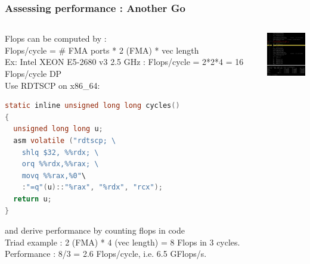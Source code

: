 \begin{frame}[containsverbatim]
\frametitle{Assessing performance : Another Go}

\begin{columns}[c]
	\begin{column}{7cm}
{\footnotesize
Flops can be computed by :
\\
Flops/cycle = \# FMA ports * 2 (FMA) * vec length
\\
Ex: Intel XEON E5-2680 v3 2.5 GHz : Flops/cycle = 2*2*4 = 16 Flops/cycle DP
\\
Use RDTSCP on x86\_64:
\\
{\tiny
\begin{lstlisting}[language=C]
static inline unsigned long long cycles()
{
  unsigned long long u;
  asm volatile ("rdtscp; \
    shlq $32, %%rdx; \
    orq %%rdx,%%rax; \
    movq %%rax,%0"\
    :"=q"(u)::"%rax", "%rdx", "rcx");
  return u;
}
\end{lstlisting}
}
and derive performance by counting flops in code
\\
Triad example : 2 (FMA) * 4 (vec length) = 8 Flops in 3 cycles. Performance : 8/3 = 2.6 Flops/cycle, i.e. 6.5 GFlops/s. 
}
	\end{column} 

	\begin{column}{3cm}
	\begin{center}
	\includegraphics[width=3cm]{DayGilles/images/anothergo.jpg}
	\end{center}
	\end{column}
\end{columns} 
\end{frame}



